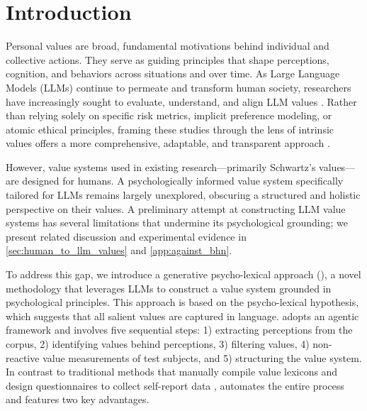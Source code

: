 \section{Introduction}

Personal values are broad, fundamental motivations behind individual and collective actions. They serve as guiding principles that shape perceptions, cognition, and behaviors across situations and over time. As Large Language Models (LLMs) continue to permeate and transform human society, researchers have increasingly sought to evaluate, understand, and align LLM values \citep{ye2025gpv, ren2024valuebench, rao2024normad, meadows2024localvaluebench, kovavc2024stick, jiang2024raising, rozen2024llms, yao2024clave, zhang2023measuring, sorensen2024value, moore2024large, demszky2023using}. Rather than relying solely on specific risk metrics, implicit preference modeling, or atomic ethical principles, framing these studies through the lens of intrinsic values \cite{schwartz2012overview} offers a more comprehensive, adaptable, and transparent approach \cite{yao2023value_fulcra, biedma2024beyond, yao2023alignment_goals}. 

However, value systems used in existing research—primarily Schwartz's values—are designed for humans. A psychologically informed value system specifically tailored for LLMs remains largely unexplored, obscuring a structured and holistic perspective on their values.
A preliminary attempt at constructing LLM value systems \cite{biedma2024beyond} has several limitations that undermine its psychological grounding; we present related discussion and experimental evidence in \cref{sec:human_to_llm_values} and \cref{app:against_bhn}.

To address this gap, we introduce a generative psycho-lexical approach (\our{}), a novel methodology that leverages LLMs to construct a value system grounded in psychological principles. This approach is based on the psycho-lexical hypothesis, which suggests that all salient values are captured in language. \our{} adopts an agentic framework and involves five sequential steps: 1) extracting perceptions from the corpus, 2) identifying values behind perceptions, 3) filtering values, 4) non-reactive value measurements of test subjects, and 5) structuring the value system. In contrast to traditional methods that manually compile value lexicons and design questionnaires to collect self-report data \cite{aavik2002structure, crectu2012psycho, Klages1929-KLATSO-5, saucier2000isms}, \our{} automates the entire process and features two key advantages.

